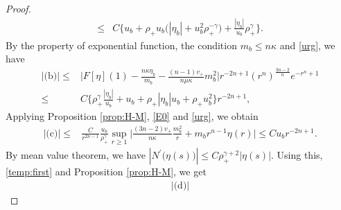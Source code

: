 \documentclass[a4paper,12pt,draft]{article}
\theoremstyle{remark}
\begin{document}
\begin{proof}
\begin{align*}
        \le & C \Big\{ u_b + \rho_{+} u_b \big(|\eta_b| + u_b^2 \rho_{+}^{-\gamma}\big)  + \frac{|\eta_b|}{u_b} \rho_{+}^{\gamma} \Big\}.
    \end{align*}
    By the property of exponential function, the condition $m_b\le n\kappa$ and \eqref{urg}, we have
    \begin{align*}
        |\textrm{(b)}| \le& \Big| F[\eta](1) - \frac{n\kappa \eta_b}{m_b} - \frac{(n-1)v_{+}}{n\mu\kappa}m_b^2 \Big| r^{-2n+1} (r^n)^{\frac{3n-2}{n}} e^{-r^n+1}\\ 
        \le& C \Big\{ \rho_{+}^{\gamma} \frac{|\eta_b|}{u_b} + u_b  + \rho_{+}|\eta_b| u_b + \rho_{+} u_b^2 \Big\} r^{-2n+1},
    \end{align*}
    Applying Proposition \ref{prop:H-M}, \eqref{E0} and \eqref{urg}, we obtain
    \begin{align*}
        |\textrm{(c)}|%
        \le& \frac{C}{r^{2n-1}} \frac{u_b}{\rho_{+}^{\gamma}} \sup\limits_{r\ge 1} \Big| \frac{(3n-2)v_{+}}{n\kappa} \frac{m_b^2}{r} + m_b r^{n-1} \eta(r) \Big| 
        \le C u_b r^{-2n+1}.
    \end{align*}
    By mean value theorem, we have $|N^{\prime}\big(\eta(s)\big)| \le C \rho_{+}^{\gamma+2} |\eta(s)|$. Using this, \eqref{temp:first} and Proposition \ref{prop:H-M}, we get
    \begin{align*}
        |\textrm{(d)}|%

\end{align*}
\end{proof}
\end{document}
